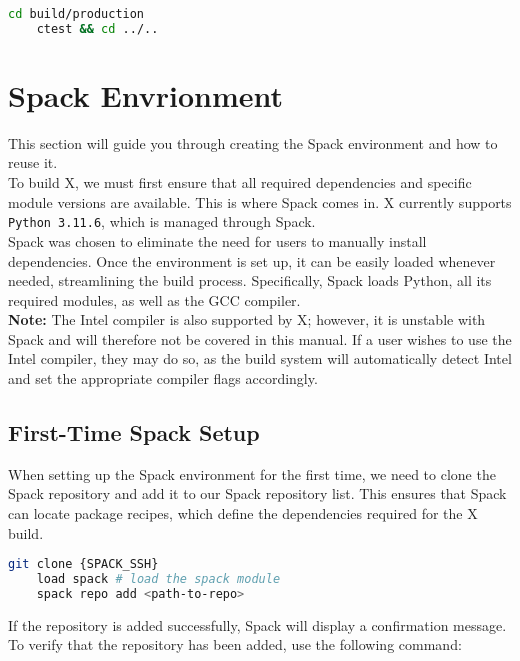 \documentclass[a4paper,12pt]{article}
\begin{document}
\begin{lstlisting}[language=bash]
    cd build/production 
    ctest && cd ../.. 
\end{lstlisting}

\section{Spack Envrionment}

This section will guide you through creating the Spack environment and how to reuse it. \\

To build X, we must first ensure that all required dependencies and specific module versions are available. This is where Spack comes in. X currently supports \texttt{Python 3.11.6}, which is managed through Spack. \\

Spack was chosen to eliminate the need for users to manually install dependencies. Once the environment is set up, it can be easily loaded whenever needed, streamlining the build process. Specifically, Spack loads Python, all its required modules, as well as the GCC compiler. \\

\textbf{Note:} The Intel compiler is also supported by X; however, it is unstable with Spack and will therefore not be covered in this manual. If a user wishes to use the Intel compiler, they may do so, as the build system will automatically detect Intel and set the appropriate compiler flags accordingly.

\subsection{First-Time Spack Setup}

When setting up the Spack environment for the first time, we need to clone the Spack repository and add it to our Spack repository list. This ensures that Spack can locate package recipes, which define the dependencies required for the X build. 

\vspace{1em} 
\begin{lstlisting}[language=bash]    
    git clone {SPACK_SSH}
    load spack # load the spack module  
    spack repo add <path-to-repo> 
\end{lstlisting} 
\vspace{1em} 

If the repository is added successfully, Spack will display a confirmation message. To verify that the repository has been added, use the following command:
\end{document}

